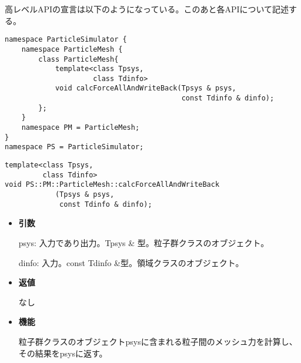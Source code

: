 
高レベルAPIの宣言は以下のようになっている。このあと各APIについて記述す
る。
\begin{lstlisting}[caption=ParticleMesh1]
namespace ParticleSimulator {
    namespace ParticleMesh {
        class ParticleMesh{
            template<class Tpsys,
                     class Tdinfo>
            void calcForceAllAndWriteBack(Tpsys & psys,
                                          const Tdinfo & dinfo);
        };
    }
    namespace PM = ParticleMesh;
}
namespace PS = ParticleSimulator;
\end{lstlisting}


\begin{screen}
\begin{verbatim}
template<class Tpsys,
         class Tdinfo>
void PS::PM::ParticleMesh::calcForceAllAndWriteBack
            (Tpsys & psys,
             const Tdinfo & dinfo);
\end{verbatim}
\end{screen}

\begin{itemize}

\item {\bf 引数}

  psys: 入力であり出力。Tpsys \& 型。粒子群クラスのオブジェクト。

  dinfo: 入力。const Tdinfo \&型。領域クラスのオブジェクト。

\item {\bf 返値}

  なし

\item {\bf 機能}

  粒子群クラスのオブジェクトpsysに含まれる粒子間のメッシュ力を計算し、
  その結果をpsysに返す。

\end{itemize}


